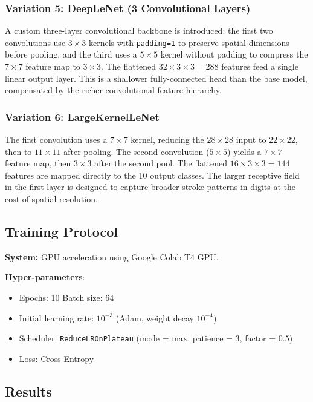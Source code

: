 \documentclass[12pt, a4paper]{article}
\begin{document}
\subsubsection*{Variation 5: DeepLeNet (3 Convolutional Layers)}

A custom three-layer convolutional backbone is introduced: the first two convolutions use
$3\times3$ kernels with \texttt{padding=1} to preserve spatial dimensions before pooling,
and the third uses a $5\times5$ kernel without padding to compress the $7\times7$ feature
map to $3\times3$. The flattened $32\times3\times3 = 288$ features feed a single linear
output layer. This is a shallower fully-connected head than the base model, compensated
by the richer convolutional feature hierarchy.

\subsubsection*{Variation 6: LargeKernelLeNet}

The first convolution uses a $7\times7$ kernel, reducing the $28\times28$ input to
$22\times22$, then to $11\times11$ after pooling. The second convolution ($5\times5$)
yields a $7\times7$ feature map, then $3\times3$ after the second pool. The flattened
$16\times3\times3 = 144$ features are mapped directly to the 10 output classes. The
larger receptive field in the first layer is designed to capture broader stroke patterns
in digits at the cost of spatial resolution.

\subsection{Training Protocol}

\textbf{System:} GPU acceleration using Google Colab T4 GPU.

\textbf{Hyper-parameters}:
\begin{itemize}
    \item Epochs: 10 \quad Batch size: 64
    \item Initial learning rate: $10^{-3}$ (Adam, weight decay $10^{-4}$)
    \item Scheduler: \texttt{ReduceLROnPlateau} (mode = max, patience = 3, factor = 0.5)
    \item Loss: Cross-Entropy
\end{itemize}

\subsection{Results}
\end{document}
